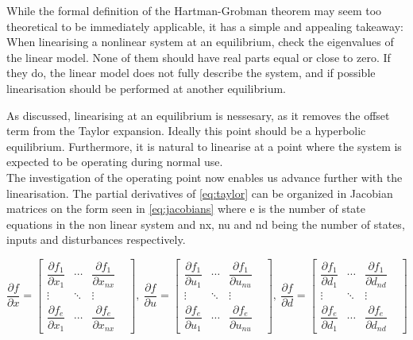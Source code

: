 While the formal definition of the Hartman-Grobman theorem may seem too theoretical to be immediately applicable, it has a simple and appealing takeaway: When linearising a nonlinear system at an equilibrium, check the eigenvalues of the linear model. None of them should have real parts equal or close to zero. If they do, the linear model does not fully describe the system, and if possible linearisation should be performed at another equilibrium.


As discussed, linearising at an equilibrium is nessesary, as it removes the offset term from the Taylor expansion. Ideally this point should be a hyperbolic equilibrium. Furthermore, it is natural to linearise at a point where the system is expected to be operating during normal use. \\

The investigation of the operating point now enables us advance further with the linearisation. The partial derivatives of \cref{eq:taylor} can be organized in Jacobian matrices on the form seen in \cref{eq:jacobians} where e is the number of state equations in the non linear system and nx, nu and nd being the number of states, inputs and disturbances respectively.

\begin{equation} \label{eq:jacobians}
	\dfrac{\partial f}{\partial x} =
		\begin{bmatrix}
			\dfrac{\partial f_1}{\partial x_1} & \cdots & \dfrac{\partial f_1}{\partial x_{nx}} & \\
			\vdots & \ddots & \vdots & \\
			\dfrac{\partial f_e}{\partial x_1} & \cdots & \dfrac{\partial f_e}{\partial x_{nx}} &
		\end{bmatrix}, \
	\dfrac{\partial f}{\partial u} =
		\begin{bmatrix}
			\dfrac{\partial f_1}{\partial u_1} & \cdots & \dfrac{\partial f_1}{\partial u_{nu}} & \\
			\vdots & \ddots & \vdots & \\
			\dfrac{\partial f_e}{\partial u_1} & \cdots & \dfrac{\partial f_e}{\partial u_{nu}} &
		\end{bmatrix}, \
	\dfrac{\partial f}{\partial d} =
		\begin{bmatrix}
			\dfrac{\partial f_1}{\partial d_1} & \cdots & \dfrac{\partial f_1}{\partial d_{nd}} & \\
			\vdots & \ddots & \vdots & \\
			\dfrac{\partial f_e}{\partial d_1} & \cdots & \dfrac{\partial f_e}{\partial d_{nd}} &
		\end{bmatrix}
\end{equation}

